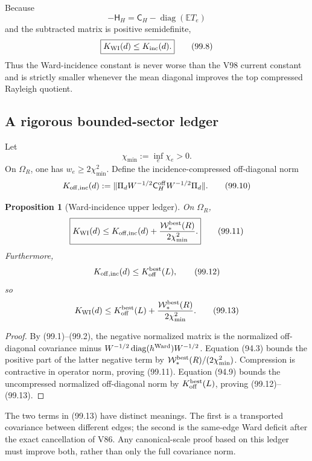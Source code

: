 \documentclass[11pt]{article}
\newtheorem{proposition}[theorem]{Proposition}
\theoremstyle{remark}
\begin{document}
Because
\[
 -\mathsf H_H
 =\mathsf C_H-\operatorname{diag}(\mathbb ET_e)     \tag{99.7}
\]
and the subtracted matrix is positive semidefinite,
\[
\boxed{K_{\rm WI}(d)\leq K_{\rm inc}(d).}           \tag{99.8}
\]
Thus the Ward-incidence constant is never worse than the V98 current
constant and is strictly smaller whenever the mean diagonal improves
the top compressed Rayleigh quotient.

\subsection{A rigorous bounded-sector ledger}

Let
\[
 \chi_{\min}:=\inf_e\chi_e>0.                       \tag{99.9}
\]
On \(\Omega_R\), one has \(w_e\geq2\chi_{\min}^2\).
Define the incidence-compressed off-diagonal norm
\[
 K_{\rm off,inc}(d)
 :=\|\Pi_dW^{-1/2}\mathsf C_H^{\rm off}
             W^{-1/2}\Pi_d\|.                      \tag{99.10}
\]

\begin{proposition}[Ward-incidence upper ledger]
\label{prop:v17v99-ledger}
On \(\Omega_R\),
\[
\boxed{
 K_{\rm WI}(d)
 \leq K_{\rm off,inc}(d)
 +\frac{\mathcal W_*^{\rm best}(R)}
        {2\chi_{\min}^2}.}                          \tag{99.11}
\]
Furthermore,
\[
 K_{\rm off,inc}(d)
 \leq K_{\rm off}^{\rm best}(L),                   \tag{99.12}
\]
so
\[
 K_{\rm WI}(d)
 \leq K_{\rm off}^{\rm best}(L)
 +\frac{\mathcal W_*^{\rm best}(R)}
        {2\chi_{\min}^2}.                           \tag{99.13}
\]
\end{proposition}

\begin{proof}
By (99.1)--(99.2), the negative normalized matrix is the normalized
off-diagonal covariance minus
\(W^{-1/2}\operatorname{diag}(h^{\rm Ward})W^{-1/2}\).
Equation (94.3) bounds the positive part of the latter negative term by
\(\mathcal W_*^{\rm best}(R)/(2\chi_{\min}^2)\).
Compression is contractive in operator norm, proving (99.11).
Equation (94.9) bounds the uncompressed normalized off-diagonal norm by
\(K_{\rm off}^{\rm best}(L)\), proving (99.12)--(99.13).
\end{proof}

The two terms in (99.13) have distinct meanings.  The first is a
transported covariance between different edges; the second is the
same-edge Ward deficit after the exact cancellation of V86.  Any
canonical-scale proof based on this ledger must improve both, rather
than only the full covariance norm.
\end{document}
